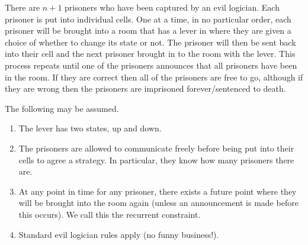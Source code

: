 \question
{}

There are $n + 1$ prisoners who have been captured by an evil logician. Each prisoner is put into individual cells. One at a time, in no particular order, each prisoner will be brought into a room that has a lever in where they are given a choice of whether to change its state or not. The prisoner will then be sent back into their cell and the next prisoner brought in to the room with the lever. This process repeats until one of the prisoners announces that all prisoners have been in the room. If they are correct then all of the prisoners are free to go, although if they are wrong then the prisoners are imprisoned forever/sentenced to death.

The following may be assumed.
\begin{enumerate}
	\item The lever has two states, up and down.
	\item The prisoners are allowed to communicate freely before being put into their cells to agree a strategy. In particular, they know how many prisoners there are.
	\item At any point in time for any prisoner, there exists a future point where they will be brought into the room again (unless an announcement is made before this occurs). We call this the recurrent constraint.
	\item Standard evil logician rules apply (no funny business!).
\end{enumerate}

